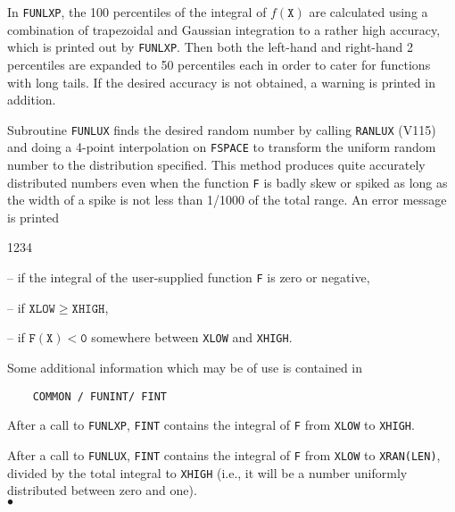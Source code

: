 \Method
In {\tt FUNLXP}, the 100 percentiles of the integral of $f(\mathtt{X})$
are calculated using a combination of
trapezoidal and Gaussian integration to a rather high accuracy,
which is printed out by {\tt FUNLXP}.
Then both the left-hand and right-hand 2 percentiles are expanded to
50 percentiles each in order to cater for functions with long tails.
If the desired accuracy is not obtained, a warning is printed in addition.
\par
Subroutine {\tt FUNLUX} finds the desired random number by calling
{\tt RANLUX} (V115) and doing a 4-point interpolation on {\tt FSPACE}
to transform the uniform random number to the distribution specified.
This method produces quite accurately distributed numbers even when
the function {\tt F} is badly skew or spiked as long as the width
of a spike is not less than 1/1000 of the total range.
\Errorh
An error message is printed
\begin{DLtt}{1234}
\item[] -- if the integral of the user-supplied function {\tt F} is zero
or negative,
\item[] -- if $\mathtt{XLOW \geq XHIGH}$,
\item[] -- if $\mathtt{F(X) < 0}$ somewhere between {\tt XLOW} and
{\tt XHIGH}.
\end{DLtt}
\newpage
\Notes
Some additional information which may be of use is contained in
\begin{verbatim}
    COMMON / FUNINT/ FINT
\end{verbatim}
After a call to {\tt FUNLXP}, {\tt FINT} contains the integral of
{\tt F} from {\tt XLOW} to {\tt XHIGH}.
\par
After a call to {\tt FUNLUX}, {\tt FINT} contains the integral of
{\tt F} from {\tt XLOW} to {\tt XRAN(LEN)}, divided by the total integral
to {\tt XHIGH} (i.e., it will be a number uniformly distributed
between zero and  one).
\\ $\bullet$
